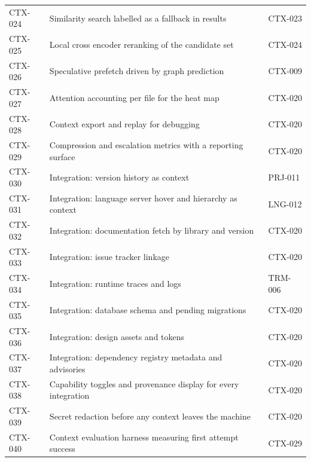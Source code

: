 \begin{longtable}{@{}p{} p{} p{}@{}}
CTX-024 & Similarity search labelled as a fallback in results & CTX-023 \\
CTX-025 & Local cross encoder reranking of the candidate set & CTX-024 \\
CTX-026 & Speculative prefetch driven by graph prediction & CTX-009 \\
CTX-027 & Attention accounting per file for the heat map & CTX-020 \\
CTX-028 & Context export and replay for debugging & CTX-020 \\
CTX-029 & Compression and escalation metrics with a reporting surface & CTX-020 \\
CTX-030 & Integration: version history as context & PRJ-011 \\
CTX-031 & Integration: language server hover and hierarchy as context & LNG-012 \\
CTX-032 & Integration: documentation fetch by library and version & CTX-020 \\
CTX-033 & Integration: issue tracker linkage & CTX-020 \\
CTX-034 & Integration: runtime traces and logs & TRM-006 \\
CTX-035 & Integration: database schema and pending migrations & CTX-020 \\
CTX-036 & Integration: design assets and tokens & CTX-020 \\
CTX-037 & Integration: dependency registry metadata and advisories & CTX-020 \\
CTX-038 & Capability toggles and provenance display for every integration & CTX-020 \\
CTX-039 & Secret redaction before any context leaves the machine & CTX-020 \\
CTX-040 & Context evaluation harness measuring first attempt success & CTX-029 \\


\end{longtable}
